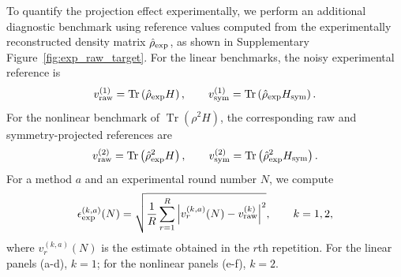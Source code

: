 \documentclass[prl,aps,notitlepage,superscriptaddress,showpacs,nofootinbib]{revtex4-2}
\begin{document}
{To quantify the projection effect experimentally, we perform an additional
diagnostic benchmark using reference values computed from the experimentally
reconstructed density matrix $\hat{\rho}_{\rm exp}$, as shown in Supplementary Figure~\ref{fig:exp_raw_target}. For the linear benchmarks,
the noisy experimental reference is
\begin{equation}
    v_{\rm raw}^{(1)}
    =
    \operatorname{Tr}
    \left(
        \hat{\rho}_{\rm exp}H
    \right),
    \qquad
    v_{\rm sym}^{(1)}
    =
    \operatorname{Tr}
    \left(
        \hat{\rho}_{\rm exp}H_{\rm sym}
    \right).
    \label{eq:linear_raw_sym_reference}
\end{equation}
For the nonlinear benchmark of $\operatorname{Tr}(\rho^2H)$, the corresponding
raw and symmetry-projected references are
\begin{equation}
    v_{\rm raw}^{(2)}
    =
    \operatorname{Tr}
    \left(
        \hat{\rho}_{\rm exp}^{2}H
    \right),
    \qquad
    v_{\rm sym}^{(2)}
    =
    \operatorname{Tr}
    \left(
        \hat{\rho}_{\rm exp}^{2}H_{\rm sym}
    \right).
    \label{eq:nonlinear_raw_sym_reference}
\end{equation}
For a method $a$ and an experimental round number $N$, we compute
\begin{equation}
    \epsilon_{\rm exp}^{(k,a)}(N)
    =
    \sqrt{
        \frac{1}{R}
        \sum_{r=1}^{R}
        \left|
            v_{r}^{(k,a)}(N)
            -
            v_{\rm raw}^{(k)}
        \right|^2
    },
    \qquad
    k=1,2 ,
    \label{eq:exp_reference_rmse}
\end{equation}
where $v_r^{(k,a)}(N)$ is the estimate obtained in the $r$th repetition.
For the linear panels (a-d), $k=1$; for the nonlinear panels (e-f),
$k=2$. 
}
\end{document}
